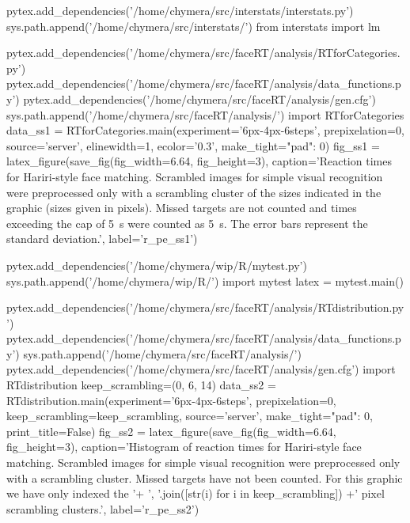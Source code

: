 \begin{pycode}
pytex.add_dependencies('/home/chymera/src/interstats/interstats.py')
sys.path.append('/home/chymera/src/interstats/')
from interstats import lm
\end{pycode}
\begin{pycode}
pytex.add_dependencies('/home/chymera/src/faceRT/analysis/RTforCategories.py')
pytex.add_dependencies('/home/chymera/src/faceRT/analysis/data_functions.py')
pytex.add_dependencies('/home/chymera/src/faceRT/analysis/gen.cfg')
sys.path.append('/home/chymera/src/faceRT/analysis/')
import RTforCategories
data_ss1 = RTforCategories.main(experiment='6px-4px-6steps', prepixelation=0, source='server', elinewidth=1, ecolor='0.3', make_tight={"pad": 0})
fig_ss1 = latex_figure(save_fig(fig_width=6.64, fig_height=3), caption='Reaction times for Hariri-style face matching. Scrambled images for simple visual recognition were preprocessed only with a scrambling cluster of the sizes indicated in the graphic (sizes given in pixels). Missed targets are not counted and times exceeding the cap of \SI{5}{\second} were counted as \SI{5}{\second}. The error bars represent the standard deviation.', label='r_pe_ss1')
\end{pycode}
\begin{pycode}
pytex.add_dependencies('/home/chymera/wip/R/mytest.py')
sys.path.append('/home/chymera/wip/R/')
import mytest
latex = mytest.main()
\end{pycode}
\begin{pycode}
pytex.add_dependencies('/home/chymera/src/faceRT/analysis/RTdistribution.py')
pytex.add_dependencies('/home/chymera/src/faceRT/analysis/data_functions.py')
sys.path.append('/home/chymera/src/faceRT/analysis/')
pytex.add_dependencies('/home/chymera/src/faceRT/analysis/gen.cfg')
import RTdistribution
keep_scrambling=(0, 6, 14)
data_ss2 = RTdistribution.main(experiment='6px-4px-6steps', prepixelation=0, keep_scrambling=keep_scrambling, source='server', make_tight={"pad": 0}, print_title=False)
fig_ss2 = latex_figure(save_fig(fig_width=6.64, fig_height=3), caption='Histogram of reaction times for Hariri-style face matching. Scrambled images for simple visual recognition were preprocessed only with a scrambling cluster. Missed targets have not been counted. For this graphic we have only indexed the '+ ', '.join([str(i) for i in keep_scrambling]) +' pixel scrambling clusters.', label='r_pe_ss2')
\end{pycode}
